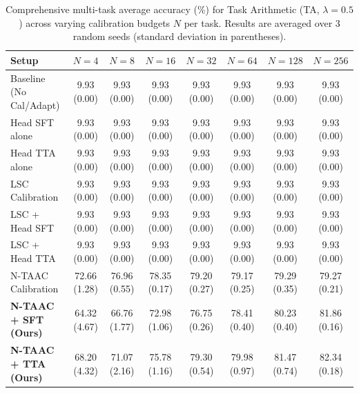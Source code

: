 \documentclass{article}
\theoremstyle{plain}
\theoremstyle{definition}
\theoremstyle{remark}
\begin{document}
\begin{table}[ht]
\centering
\caption{Comprehensive multi-task average accuracy (\%) for Task Arithmetic (TA, $\lambda=0.5$) across varying calibration budgets $N$ per task. Results are averaged over 3 random seeds (standard deviation in parentheses).}
\label{tab:appendix_ta_05}
\vskip 0.15in
\begin{sc}
\begin{scriptsize}
\setlength{\tabcolsep}{3pt}
\begin{tabular}{lccccccc}
\toprule
Setup & $N=4$ & $N=8$ & $N=16$ & $N=32$ & $N=64$ & $N=128$ & $N=256$ \\
\midrule
Baseline (No Cal/Adapt) & 9.93 (0.00) & 9.93 (0.00) & 9.93 (0.00) & 9.93 (0.00) & 9.93 (0.00) & 9.93 (0.00) & 9.93 (0.00) \\
Head SFT alone & 9.93 (0.00) & 9.93 (0.00) & 9.93 (0.00) & 9.93 (0.00) & 9.93 (0.00) & 9.93 (0.00) & 9.93 (0.00) \\
Head TTA alone & 9.93 (0.00) & 9.93 (0.00) & 9.93 (0.00) & 9.93 (0.00) & 9.93 (0.00) & 9.93 (0.00) & 9.93 (0.00) \\
LSC Calibration & 9.93 (0.00) & 9.93 (0.00) & 9.93 (0.00) & 9.93 (0.00) & 9.93 (0.00) & 9.93 (0.00) & 9.93 (0.00) \\
LSC + Head SFT & 9.93 (0.00) & 9.93 (0.00) & 9.93 (0.00) & 9.93 (0.00) & 9.93 (0.00) & 9.93 (0.00) & 9.93 (0.00) \\
LSC + Head TTA & 9.93 (0.00) & 9.93 (0.00) & 9.93 (0.00) & 9.93 (0.00) & 9.93 (0.00) & 9.93 (0.00) & 9.93 (0.00) \\
N-TAAC Calibration & 72.66 (1.28) & 76.96 (0.55) & 78.35 (0.17) & 79.20 (0.27) & 79.17 (0.25) & 79.29 (0.35) & 79.27 (0.21) \\
\textbf{N-TAAC + SFT (Ours)} & 64.32 (4.67) & 66.76 (1.77) & 72.98 (1.06) & 76.75 (0.26) & 78.41 (0.40) & 80.23 (0.40) & 81.86 (0.16) \\
\textbf{N-TAAC + TTA (Ours)} & 68.20 (4.32) & 71.07 (2.16) & 75.78 (1.16) & 79.30 (0.54) & 79.98 (0.97) & 81.47 (0.74) & 82.34 (0.18) \\
\bottomrule
\end{tabular}
\end{scriptsize}
\end{sc}
\end{table}
\end{document}
